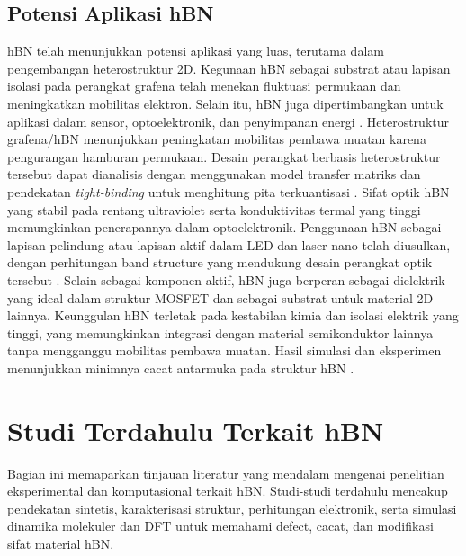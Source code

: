 \subsection{Potensi Aplikasi hBN}
hBN telah menunjukkan potensi aplikasi yang luas, terutama dalam pengembangan heterostruktur 2D.
Kegunaan hBN sebagai substrat atau lapisan isolasi pada perangkat grafena telah menekan fluktuasi permukaan dan meningkatkan mobilitas elektron.
Selain itu, hBN juga dipertimbangkan untuk aplikasi dalam sensor, optoelektronik, dan penyimpanan energi \citep{Wang2017}.
Heterostruktur grafena/hBN menunjukkan peningkatan mobilitas pembawa muatan karena pengurangan hamburan permukaan.
Desain perangkat berbasis heterostruktur tersebut dapat dianalisis dengan menggunakan model transfer matriks dan pendekatan \emph{tight-binding} untuk menghitung pita terkuantisasi \citep{CastroNeto2009}.
Sifat optik hBN yang stabil pada rentang ultraviolet serta konduktivitas termal yang tinggi memungkinkan penerapannya dalam optoelektronik.
Penggunaan hBN sebagai lapisan pelindung atau lapisan aktif dalam LED dan laser nano telah diusulkan, dengan perhitungan band structure yang mendukung desain perangkat optik tersebut \citep{Zhang2020}.
Selain sebagai komponen aktif, hBN juga berperan sebagai dielektrik yang ideal dalam struktur MOSFET dan sebagai substrat untuk material 2D lainnya.
Keunggulan hBN terletak pada kestabilan kimia dan isolasi elektrik yang tinggi, yang memungkinkan integrasi dengan material semikonduktor lainnya tanpa mengganggu mobilitas pembawa muatan.
Hasil simulasi dan eksperimen menunjukkan minimnya cacat antarmuka pada struktur hBN \citep{Bhimanapati2016}.

\section{Studi Terdahulu Terkait hBN}
Bagian ini memaparkan tinjauan literatur yang mendalam mengenai penelitian eksperimental dan komputasional terkait hBN.
Studi-studi terdahulu mencakup pendekatan sintetis, karakterisasi struktur, perhitungan elektronik, serta simulasi dinamika molekuler dan DFT untuk memahami defect, cacat, dan modifikasi sifat material hBN.


